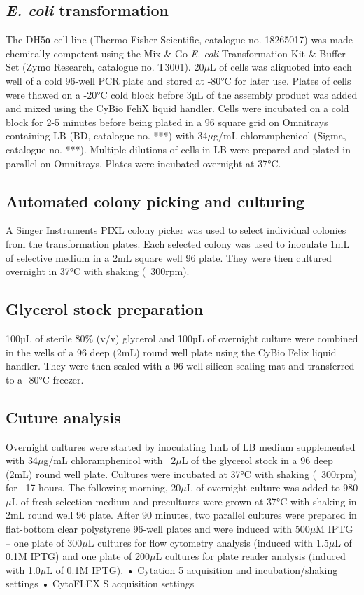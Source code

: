\subsection{\textit{E. coli} transformation}
The DH5α cell line (Thermo Fisher Scientific, catalogue no. 18265017) was made chemically competent using the Mix & Go \textit{E. coli} Transformation Kit & Buffer Set (Zymo Research, catalogue no. T3001). 20\(\mu\)L of cells was aliquoted into each well of a cold 96-well PCR plate and stored at -80°C for later use. Plates of cells were thawed on a -20°C cold block before 3µL of the assembly product was added and mixed using the CyBio FeliX liquid handler. Cells were incubated on a cold block for 2-5 minutes before being plated in a 96 square grid on Omnitrays containing LB (BD, catalogue no. ***) with 34\(\mu\)g/mL chloramphenicol (Sigma, catalogue no. ***). Multiple dilutions of cells in LB were prepared and plated in parallel on Omnitrays. Plates were incubated overnight at 37°C.

\subsection{Automated colony picking and culturing}
A Singer Instruments PIXL colony picker was used to select individual colonies from the transformation plates. Each selected colony was used to inoculate 1mL of selective medium in a 2mL square well 96 plate. They were then cultured overnight in 37°C with shaking (~300rpm).

\subsection{Glycerol stock preparation}
100µL of sterile 80\% (v/v) glycerol and 100µL of overnight culture were combined in the wells of a 96 deep (2mL) round well plate using the CyBio Felix liquid handler. They were then sealed with a 96-well silicon sealing mat and transferred to a -80°C freezer. 

\subsection{Cuture analysis}
Overnight cultures were started by inoculating 1mL of LB medium supplemented with 34\(\mu\)g/mL chloramphenicol with ~2\(\mu\)L of the glycerol stock in a 96 deep (2mL) round well plate. Cultures were incubated at 37°C with shaking (~300rpm) for ~17 hours. The following morning, 20\(\mu\)L of overnight culture was added to 980\(\mu\)L of fresh selection medium and precultures were grown at 37°C with shaking in 2mL round well 96 plate. 
After 90 minutes, two parallel cultures were prepared in flat-bottom clear polystyrene 96-well plates and were induced with 500\(\mu\)M IPTG – one plate of 300\(\mu\)L cultures for flow cytometry analysis (induced with 1.5\(\mu\)L of 0.1M IPTG) and one plate of 200\(\mu\)L cultures for plate reader analysis (induced with 1.0\(\mu\)L of 0.1M IPTG).
•	Cytation 5 acquisition and incubation/shaking settings
•	CytoFLEX S acquisition settings

